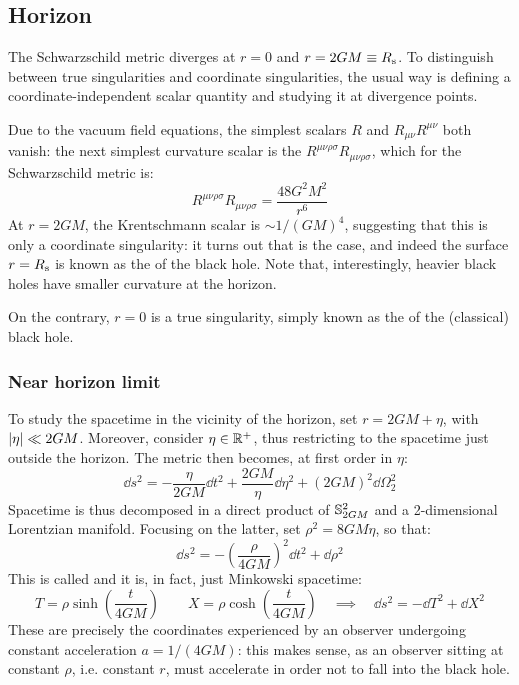 \subsection{Horizon}
\label{sec:schwarz-horizon}

The Schwarzschild metric diverges at $ r = 0 $ and $ r = 2GM \equiv R_\text{s} $. To distinguish between true singularities and coordinate singularities, the usual way is defining a coordinate-independent scalar quantity and studying it at divergence points.

Due to the vacuum field equations, the simplest scalars $ R $ and $ R_{\mu \nu} R^{\mu \nu} $ both vanish: the next simplest curvature scalar is the  $ R^{\mu \nu \rho \sigma} R_{\mu \nu \rho \sigma} $, which for the Schwarzschild metric is:
\begin{equation}
  R^{\mu \nu \rho \sigma} R_{\mu \nu \rho \sigma} = \frac{48 G^2 M^2}{r^6}
\end{equation}
At $ r = 2GM $, the Krentschmann scalar is $ \sim 1 / (GM)^4 $, suggesting that this is only a coordinate singularity: it turns out that is the case, and indeed the surface $ r = R_\text{s} $ is known as the  of the black hole. Note that, interestingly, heavier black holes have smaller curvature at the horizon.

On the contrary, $ r = 0 $ is a true singularity, simply known as the  of the (classical) black hole.

\subsubsection{Near horizon limit}

To study the spacetime in the vicinity of the horizon, set $ r = 2GM + \eta $, with $ \left\lvert\eta\right\rvert \ll 2GM $. Moreover, consider $ \eta \in \mathbb{R}^+ $, thus restricting to the spacetime just outside the horizon. The metric then becomes, at first order in $ \eta $:
\begin{equation*}
  \dd s^2 = - \frac{\eta}{2GM} \dd t^2 + \frac{2GM}{\eta} \dd \eta^2 + (2GM)^2 \dd \Omega_2^2
\end{equation*}
Spacetime is thus decomposed in a direct product of $ \mathbb{S}^{2}_{2GM} $ and a 2-dimensional Lorentzian manifold. Focusing on the latter, set $ \rho^2 = 8GM \eta $, so that:
\begin{equation}
  \dd s^2 = - \left( \frac{\rho}{4GM} \right)^2 \dd t^2 + \dd \rho^2
\end{equation}
This is called  and it is, in fact, just Minkowski spacetime:
\begin{equation*}
  T = \rho \sinh \left( \frac{t}{4GM} \right)
  \qquad
  X = \rho \cosh \left( \frac{t}{4GM} \right)
  \quad \implies \quad
  \dd s^2 = - \dd T^2 + \dd X^2
\end{equation*}
These are precisely the coordinates  experienced by an observer undergoing constant acceleration $ a = 1 / (4GM) $: this makes sense, as an observer sitting at constant $ \rho $, i.e. constant $ r $, must accelerate in order not to fall into the black hole.

